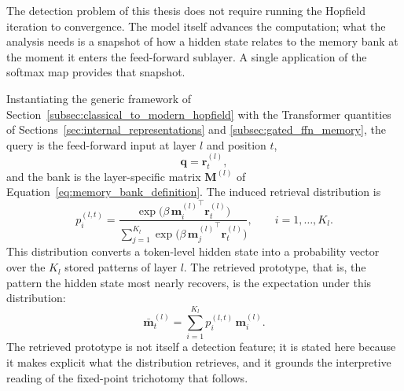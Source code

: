 The detection problem of this thesis does not require running the Hopfield
iteration to convergence. The model itself advances the computation; what the
analysis needs is a snapshot of how a hidden state relates to the memory bank
at the moment it enters the feed-forward sublayer. A single application of the
softmax map provides that snapshot.

Instantiating the generic framework of
Section~\ref{subsec:classical_to_modern_hopfield} with the Transformer
quantities of Sections~\ref{sec:internal_representations} and
\ref{subsec:gated_ffn_memory}, the query is the feed-forward input at layer
$l$ and position $t$,
\begin{equation}
    \mathbf{q} = \mathbf{r}_t^{(l)},
    \label{eq:query_identification}
\end{equation}
and the bank is the layer-specific matrix $\mathbf{M}^{(l)}$ of
Equation~\eqref{eq:memory_bank_definition}. The induced retrieval distribution
is
\begin{equation}
    p_i^{(l,t)}
    =
    \frac{
        \exp\!\bigl(\beta\,{\mathbf{m}_i^{(l)}}^{\!\top}\mathbf{r}_t^{(l)}\bigr)
    }{
        \sum_{j=1}^{K_l}
        \exp\!\bigl(\beta\,{\mathbf{m}_j^{(l)}}^{\!\top}\mathbf{r}_t^{(l)}\bigr)
    },
    \qquad i = 1, \ldots, K_l.
    \label{eq:retrieval_distribution}
\end{equation}
This distribution converts a token-level hidden state into a probability
vector over the $K_l$ stored patterns of layer $l$. The retrieved prototype,
that is, the pattern the hidden state most nearly recovers, is the expectation
under this distribution:
\begin{equation}
    \bar{\mathbf{m}}_t^{(l)}
    =
    \sum_{i=1}^{K_l} p_i^{(l,t)}\,\mathbf{m}_i^{(l)}.
    \label{eq:retrieved_pattern}
\end{equation}
The retrieved prototype is not itself a detection feature; it is stated here
because it makes explicit what the distribution retrieves, and it grounds the
interpretive reading of the fixed-point trichotomy that follows.


